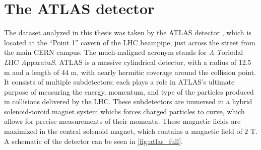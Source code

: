 

\chapter[The ATLAS detector][Top of Page Title]{The ATLAS detector} \label{Chapter-ATLAS}

The dataset analyzed in this thesis was taken by the ATLAS detector \cite{PERF-2007-01}, which is located at the ``Point 1'' cavern of the LHC beampipe, just across the street from the main CERN campus.
The much-maligned acronym stands for \textit{A} \textit{T}oriodal \textit{L}HC \textit{A}pparatu\textit{S}.
ATLAS is a massive cylindrical detector, with a radius of 12.5 m and a length of 44 m, with nearly hermitic coverage around the collision point.
It consists of multiple subdetectors; each plays a role in ATLAS's ultimate purpose of measuring the energy, momentum, and type of the particles produced in collisions delivered by the LHC.
These subdetectors are immersed in a hybrid solenoid-toroid magnet system whichs forces charged particles to curve, which allows for precise measurements of their momenta.
These magnetic fields are maximized in the central solenoid magnet, which contains a magnetic field of $2$ T.
A schematic of the detector can be seen in \ref{fig:atlas_full}.

